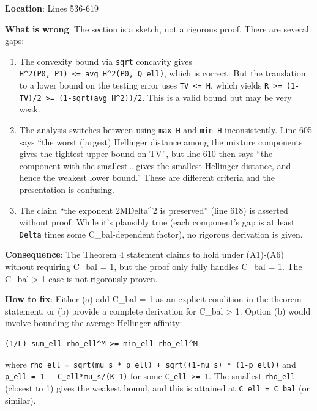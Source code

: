 \documentclass[
  12pt,
]{article}
\begin{document}
\textbf{Location}: Lines 536-619

\textbf{What is wrong}: The section is a sketch, not a rigorous proof.
There are several gaps:

\begin{enumerate}
\def\labelenumi{\arabic{enumi}.}
\item
  The convexity bound via \texttt{sqrt} concavity gives
  \texttt{H\^{}2(P0,\ P1)\ \textless{}=\ avg\ H\^{}2(P0,\ Q\_ell)},
  which is correct. But the translation to a lower bound on the testing
  error uses \texttt{TV\ \textless{}=\ H}, which yields
  \texttt{R\ \textgreater{}=\ (1-TV)/2\ \textgreater{}=\ (1-sqrt(avg\ H\^{}2))/2}.
  This is a valid bound but may be very weak.
\item
  The analysis switches between using \texttt{max\ H} and
  \texttt{min\ H} inconsistently. Line 605 says ``the worst (largest)
  Hellinger distance among the mixture components gives the tightest
  upper bound on TV'', but line 610 then says ``the component with the
  smallest\ldots{} gives the smallest Hellinger distance, and hence the
  weakest lower bound.'' These are different criteria and the
  presentation is confusing.
\item
  The claim ``the exponent 2MDelta\^{}2 is preserved'' (line 618) is
  asserted without proof. While it's plausibly true (each component's
  gap is at least \texttt{Delta} times some C\_bal-dependent factor), no
  rigorous derivation is given.
\end{enumerate}

\textbf{Consequence}: The Theorem 4 statement claims to hold under
(A1)-(A6) without requiring C\_bal = 1, but the proof only fully handles
C\_bal = 1. The C\_bal \textgreater{} 1 case is not rigorously proven.

\textbf{How to fix}: Either (a) add C\_bal = 1 as an explicit condition
in the theorem statement, or (b) provide a complete derivation for
C\_bal \textgreater{} 1. Option (b) would involve bounding the average
Hellinger affinity:

\begin{verbatim}
(1/L) sum_ell rho_ell^M >= min_ell rho_ell^M
\end{verbatim}

where
\texttt{rho\_ell\ =\ sqrt(mu\_s\ *\ p\_ell)\ +\ sqrt((1-mu\_s)\ *\ (1-p\_ell))}
and \texttt{p\_ell\ =\ 1\ -\ C\_ell*mu\_s/(K-1)} for some
\texttt{C\_ell\ \textgreater{}=\ 1}. The smallest \texttt{rho\_ell}
(closest to 1) gives the weakest bound, and this is attained at
\texttt{C\_ell\ =\ C\_bal} (or similar).
\end{document}
